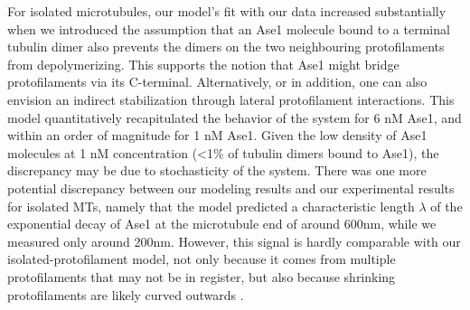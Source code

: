 For isolated microtubules, our model's fit with our data increased substantially when we introduced the assumption that an Ase1 molecule bound to a terminal tubulin dimer also prevents the dimers on the two neighbouring protofilaments from depolymerizing. This supports the notion that Ase1 might bridge protofilaments via its C-terminal. Alternatively, or in addition, one can also envision an indirect stabilization through lateral protofilament interactions. This model quantitatively recapitulated the behavior of the system for 6 nM Ase1, and within an order of magnitude for 1 nM Ase1. Given the low density of Ase1 molecules at 1 nM concentration (<1\% of tubulin dimers bound to Ase1), the discrepancy may be due to stochasticity of the system. There was one more potential discrepancy between our modeling results and our experimental results for isolated MTs, namely that the model predicted a characteristic length $\lambda$ of the exponential decay of Ase1 at the microtubule end of around 600nm, while we measured only around 200nm. However, this signal is hardly comparable with our isolated-protofilament model, not only because it comes from multiple protofilaments that may not be in register, but also because shrinking protofilaments are likely curved outwards \parencite{McIntosh2008}. \par

